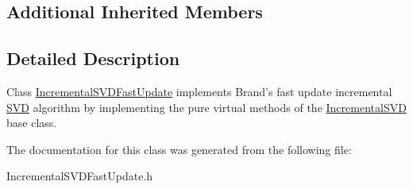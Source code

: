 \subsection*{Additional Inherited Members}


\subsection{Detailed Description}
Class \hyperlink{class_c_a_r_o_m_1_1_incremental_s_v_d_fast_update}{Incremental\-S\-V\-D\-Fast\-Update} implements Brand's fast update incremental \hyperlink{class_c_a_r_o_m_1_1_s_v_d}{S\-V\-D} algorithm by implementing the pure virtual methods of the \hyperlink{class_c_a_r_o_m_1_1_incremental_s_v_d}{Incremental\-S\-V\-D} base class. 

The documentation for this class was generated from the following file\-:\begin{DoxyCompactItemize}
\item 
Incremental\-S\-V\-D\-Fast\-Update.\-h\end{DoxyCompactItemize}
